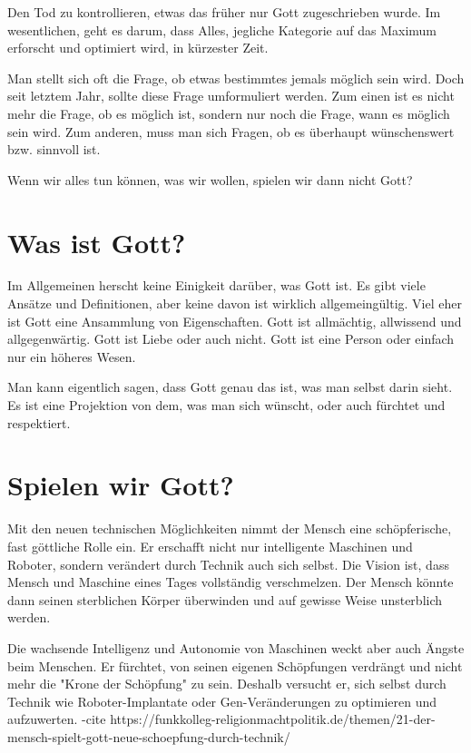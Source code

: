 \documentclass[10pt]{article}
\begin{document}
Den Tod zu kontrollieren, etwas das früher nur Gott zugeschrieben wurde.
Im wesentlichen, geht es darum, dass Alles, jegliche Kategorie auf das Maximum erforscht und optimiert wird, in kürzester Zeit.

\cite{Kurzweil}

Man stellt sich oft die Frage, ob etwas bestimmtes jemals möglich sein wird.
Doch seit letztem Jahr, sollte diese Frage umformuliert werden.
Zum einen ist es nicht mehr die Frage, ob es möglich ist, sondern nur noch die Frage, wann es möglich sein wird.
Zum anderen, muss man sich Fragen, ob es überhaupt wünschenswert bzw. sinnvoll ist.

Wenn wir alles tun können, was wir wollen, spielen wir dann nicht Gott?

\newpage
\section{Was ist Gott?}
Im Allgemeinen herscht keine Einigkeit darüber, was Gott ist.
Es gibt viele Ansätze und Definitionen, aber keine davon ist wirklich allgemeingültig.
Viel eher ist Gott eine Ansammlung von Eigenschaften.
Gott ist allmächtig, allwissend und allgegenwärtig.
Gott ist Liebe oder auch nicht.
Gott ist eine Person oder einfach nur ein höheres Wesen.


Man kann eigentlich sagen, dass Gott genau das ist, was man selbst darin sieht.
Es ist eine Projektion von dem, was man sich wünscht, oder auch fürchtet und respektiert.

\cite{gottkennen}
\cite{Jesushaus}

\section{Spielen wir Gott?}
Mit den neuen technischen Möglichkeiten nimmt der Mensch eine schöpferische, fast göttliche Rolle ein. Er erschafft nicht nur intelligente Maschinen und Roboter, sondern verändert durch Technik auch sich selbst. Die Vision ist, dass Mensch und Maschine eines Tages vollständig verschmelzen. Der Mensch könnte dann seinen sterblichen Körper überwinden und auf gewisse Weise unsterblich werden.

Die wachsende Intelligenz und Autonomie von Maschinen weckt aber auch Ängste beim Menschen. Er fürchtet, von seinen eigenen Schöpfungen verdrängt und nicht mehr die "Krone der Schöpfung" zu sein. Deshalb versucht er, sich selbst durch Technik wie Roboter-Implantate oder Gen-Veränderungen zu optimieren und aufzuwerten.
-cite https://funkkolleg-religionmachtpolitik.de/themen/21-der-mensch-spielt-gott-neue-schoepfung-durch-technik/
\end{document}
